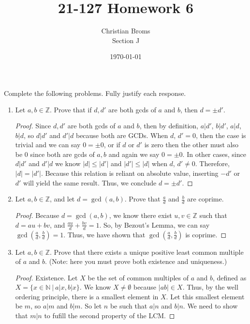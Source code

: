 \documentclass[12pt]{article}
\newcommand{\abs}[1]{\left| #1\right|}
\DeclareMathOperator{\Gcd}{gcd}
\renewcommand{\gcd}[2]{\Gcd\left(#1, #2\right)}
\newcommand{\Z}{\mathbb{Z}}
\newcommand{\N}{\mathbb{N}}
\begin{document}
\title{21-127 Homework 6}
\author{Christian Broms \\ Section J}
\date{\today}
\maketitle

Complete the following problems. Fully justify each response.

\begin{enumerate}

\item Let $a, b\in \Z$. Prove that if $d, d'$ are both gcds of $a$ and $b$, then $d=\pm d'$.

\begin{proof}
Since $d, d'$ are both gcds of $a$ and $b$, then by definition, $a|d'$, $b|d'$, $a|d$, $b|d$, so $d|d'$ and $d'|d$ because both are GCDs. When $d$, $d' = 0$, then the case is trivial and we can say $0 = \pm0$, or if $d$ or $d'$ is zero then the other must also be 0 since both are gcds of $a, b$ and again we say $0 = \pm0$. In other cases, since $d|d'$ and $d'|d$ we know $\abs{d} \leq \abs{d'}$ and $\abs{d'} \leq \abs{d}$ when $d$, $d' \neq 0$. Therefore, $\abs{d} = \abs{d'}$. Because this relation is reliant on absolute value, inserting $-d'$ or $d'$ will yield the same result. Thus, we conclude $d=\pm d'$.
\end{proof}

\item Let $a, b\in \Z$, and let $d=\gcd{a}{b}$. Prove that $\frac{a}{d}$ and $\frac{b}{d}$ are coprime.

\begin{proof}
Because $d=\gcd{a}{b}$, we know there exist $u, v \in \Z$ such that $d = au + bv$, and $\frac{au}{d} + \frac{bv}{d}=1$. So, by Bezout's Lemma, we can say $\gcd{\frac{a}{d}}{\frac{b}{d}} = 1$. Thus, we have shown that $\gcd{\frac{a}{d}}{\frac{b}{d}}$ is coprime. 
\end{proof}

\item Let $a, b\in \Z$. Prove that there exists a unique positive least common multiple of $a$ and $b$. (Note: here you must prove both existence and uniqueness.)

\begin{proof}
Existence. Let $X$ be the set of common multiples of $a$ and $b$, defined as $X = \{x \in \N\ |\ a|x, b|x\}$. We know $X \neq \emptyset$ because $\abs{ab} \in X$. Thus, by the well ordering principle, there is a smallest element in $X$. Let this smallest element be $m$, so $a|m$ and $b|m$. So let $n$ be such that $a | n$ and $b | n$. We need to show that $m | n$ to fufill the second property of the LCM. 


\end{proof}
\end{enumerate}
\end{document}
